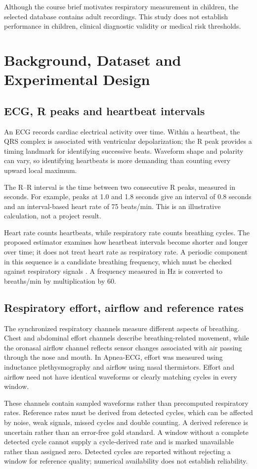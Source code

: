 Although the course brief motivates respiratory measurement in children, the selected database contains adult recordings. This study does not establish performance in children, clinical diagnostic validity or medical risk thresholds.

\clearpage
\chapter{Background, Dataset and Experimental Design}
\section{ECG, R peaks and heartbeat intervals}
An ECG records cardiac electrical activity over time. Within a heartbeat, the QRS complex is associated with ventricular depolarization; the R peak provides a timing landmark for identifying successive beats. Waveform shape and polarity can vary, so identifying heartbeats is more demanding than counting every upward local maximum.

The R--R interval is the time between two consecutive R peaks, measured in seconds. For example, peaks at 1.0 and 1.8 seconds give an interval of 0.8 seconds and an interval-based heart rate of 75 beats/min. This is an illustrative calculation, not a project result.

Heart rate counts heartbeats, while respiratory rate counts breathing cycles. The proposed estimator examines how heartbeat intervals become shorter and longer over time; it does not treat heart rate as respiratory rate. A periodic component in this sequence is a candidate breathing frequency, which must be checked against respiratory signals \cite{hirsch}. A frequency measured in Hz is converted to breaths/min by multiplication by 60.

\section{Respiratory effort, airflow and reference rates}
The synchronized respiratory channels measure different aspects of breathing. Chest and abdominal effort channels describe breathing-related movement, while the oronasal airflow channel reflects sensor changes associated with air passing through the nose and mouth. In Apnea-ECG, effort was measured using inductance plethysmography and airflow using nasal thermistors. Effort and airflow need not have identical waveforms or clearly matching cycles in every window.

These channels contain sampled waveforms rather than precomputed respiratory rates. Reference rates must be derived from detected cycles, which can be affected by noise, weak signals, missed cycles and double counting. A derived reference is uncertain rather than an error-free gold standard. A window without a complete detected cycle cannot supply a cycle-derived rate and is marked unavailable rather than assigned zero. Detected cycles are reported without rejecting a window for reference quality; numerical availability does not establish reliability.

